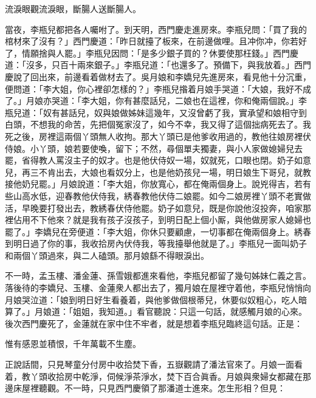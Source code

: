 \begin{myquote}
流淚眼觀流淚眼，斷腸人送斷腸人。
\end{myquote}

當夜，李瓶兒都把各人囑咐了。到天明，西門慶走進房來。李瓶兒問：「買了我的棺材來了沒有？」西門慶道：「昨日就擡了板來，在前邊做哩。且冲你冲，你若好了，情願捨與人罷。」李瓶兒因問：「是多少銀子買的？休要使那枉錢。」西門慶道：「沒多，只百十兩來銀子。」李瓶兒道：「也還多了。預備下，與我放着。」西門慶說了回出來，前邊看着做材去了。吳月娘和李嬌兒先進房來，看見他十分沉重，便問道：「李大姐，你心裡卻怎樣的？」李瓶兒揝着月娘手哭道：「大娘，我好不成了。」{}月娘亦哭道：「李大姐，你有甚麼話兒，二娘也在這裡，你和俺兩個說。」李瓶兒道：「奴有甚話兒，奴與娘做姊妹這幾年，又沒曾虧了我，實承望和娘相守到白頭，不想我的命苦，先把個冤家沒了，如今不幸，我又得了這個拙病死去了。我死之後，房裡這兩個丫頭無人收拘。那大丫頭已是他爹收用過的，教他往娘房裡伏侍娘。小丫頭，娘若要使喚，留下；不然，尋個單夫獨妻，與小人家做媳婦兒去罷，省得教人罵沒主子的奴才。也是他伏侍奴一場，奴就死，口眼也閉。奶子如意兒，再三不肯出去，大娘也看奴分上，也是他奶孩兒一場，明日娘生下哥兒，就教接他奶兒罷。」月娘說道：「李大姐，你放寬心，都在俺兩個身上。說兇得吉，若有些山高水低，迎春教他伏侍我，綉春教他伏侍二娘罷。如今二娘房裡丫頭不老實做活，早晚要打發出去，教綉春伏侍他罷。奶子如意兒，既是你說他沒投奔，咱家那裡佔用不下他來？就是我有孩子沒孩子，到明日配上個小厮，與他做房家人媳婦也罷了。」李嬌兒在旁便道：「李大姐，你休只要顧慮，一切事都在俺兩個身上。綉春到明日過了你的事，我收拾房內伏侍我，等我擡舉他就是了。」李瓶兒一面叫奶子和兩個丫頭過來，與二人磕頭。那月娘繇不得眼淚出。

不一時，孟玉樓、潘金蓮、孫雪娥都進來看他，李瓶兒都留了幾句姊妹仁義之言。{}落後待的李嬌兒、玉樓、金蓮衆人都出去了，獨月娘在屋裡守着他，李瓶兒悄悄向月娘哭泣道：「娘到明日好生看養着，與他爹做個根蒂兒，休要似奴粗心，吃人暗算了。」{}月娘道：「姐姐，我知道。」看官聽說：只這一句話，就感觸月娘的心來。後次西門慶死了，金蓮就在家中住不牢者，就是想着李瓶兒臨終這句話。正是：

\begin{myquote}
惟有感恩並積恨，千年萬載不生塵。
\end{myquote}

正說話間，只見琴童分付房中收拾焚下香，五嶽觀請了潘法官來了。月娘一面看着，教丫頭收拾房中乾淨，伺候淨茶淨水，焚下百合眞香。月娘與衆婦女都藏在那邊床屋裡聽觀。不一時，只見西門慶領了那潘道士進來。怎生形相？但見：

